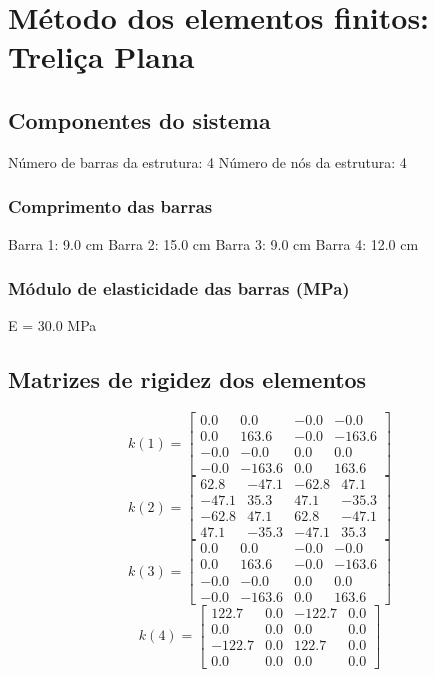 \documentclass{article}%
\begin{document}
%
\normalsize%
\section{Método dos elementos finitos: Treliça Plana}%
\label{sec:MtododoselementosfinitosTreliaPlana}%
\subsection{Componentes do sistema}%
\label{subsec:Componentesdosistema}%
Número de barras da estrutura: 4\newline%
%
Número de nós da estrutura: 4%
\subsubsection{Comprimento das barras}%
\label{ssubsec:Comprimentodasbarras}%
Barra 1: 9.0 cm\newline%
%
Barra 2: 15.0 cm\newline%
%
Barra 3: 9.0 cm\newline%
%
Barra 4: 12.0 cm

%
\subsubsection{Módulo de elasticidade das barras (MPa)}%
\label{ssubsec:Mdulodeelasticidadedasbarras(MPa)}%
E = 30.0 MPa

%
\subsection{Matrizes de rigidez dos elementos}%
\label{subsec:Matrizesderigidezdoselementos}%
\[%
k(1)= \begin{bmatrix}%
0.0&0.0&-0.0&-0.0\\%
0.0&163.6&-0.0&-163.6\\%
-0.0&-0.0&0.0&0.0\\%
-0.0&-163.6&0.0&163.6%
\end{bmatrix}%
\]%
\[%
k(2)= \begin{bmatrix}%
62.8&-47.1&-62.8&47.1\\%
-47.1&35.3&47.1&-35.3\\%
-62.8&47.1&62.8&-47.1\\%
47.1&-35.3&-47.1&35.3%
\end{bmatrix}%
\]%
\[%
k(3)= \begin{bmatrix}%
0.0&0.0&-0.0&-0.0\\%
0.0&163.6&-0.0&-163.6\\%
-0.0&-0.0&0.0&0.0\\%
-0.0&-163.6&0.0&163.6%
\end{bmatrix}%
\]%
\[%
k(4)= \begin{bmatrix}%
122.7&0.0&-122.7&0.0\\%
0.0&0.0&0.0&0.0\\%
-122.7&0.0&122.7&0.0\\%
0.0&0.0&0.0&0.0%
\end{bmatrix}%
\]
\end{document}
